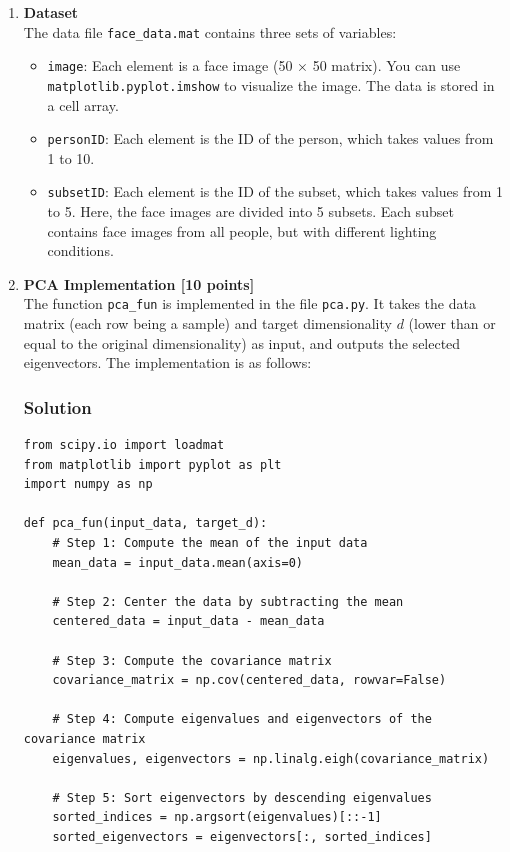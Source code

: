 \documentclass{article}
\begin{document}
\begin{enumerate}[label=(\alph*)]
    \item \textbf{Dataset} \\
    The data file \texttt{face\_data.mat} contains three sets of variables:
    \begin{itemize}
        \item \texttt{image}: Each element is a face image (50 × 50 matrix). You can use \texttt{matplotlib.pyplot.imshow} to visualize the image. The data is stored in a cell array.
        \item \texttt{personID}: Each element is the ID of the person, which takes values from 1 to 10.
        \item \texttt{subsetID}: Each element is the ID of the subset, which takes values from 1 to 5. Here, the face images are divided into 5 subsets. Each subset contains face images from all people, but with different lighting conditions.
    \end{itemize}

    \item \textbf{PCA Implementation [10 points]} \\
    The function \texttt{pca\_fun} is implemented in the file \texttt{pca.py}. It takes the data matrix (each row being a sample) and target dimensionality $d$ (lower than or equal to the original dimensionality) as input, and outputs the selected eigenvectors. The implementation is as follows:
    
    \subsubsection*{Solution}
    \begin{verbatim}
from scipy.io import loadmat
from matplotlib import pyplot as plt
import numpy as np

def pca_fun(input_data, target_d):
    # Step 1: Compute the mean of the input data
    mean_data = input_data.mean(axis=0)

    # Step 2: Center the data by subtracting the mean
    centered_data = input_data - mean_data

    # Step 3: Compute the covariance matrix
    covariance_matrix = np.cov(centered_data, rowvar=False)

    # Step 4: Compute eigenvalues and eigenvectors of the covariance matrix
    eigenvalues, eigenvectors = np.linalg.eigh(covariance_matrix)

    # Step 5: Sort eigenvectors by descending eigenvalues
    sorted_indices = np.argsort(eigenvalues)[::-1]
    sorted_eigenvectors = eigenvectors[:, sorted_indices]


\end{verbatim}
\end{enumerate}
\end{document}
